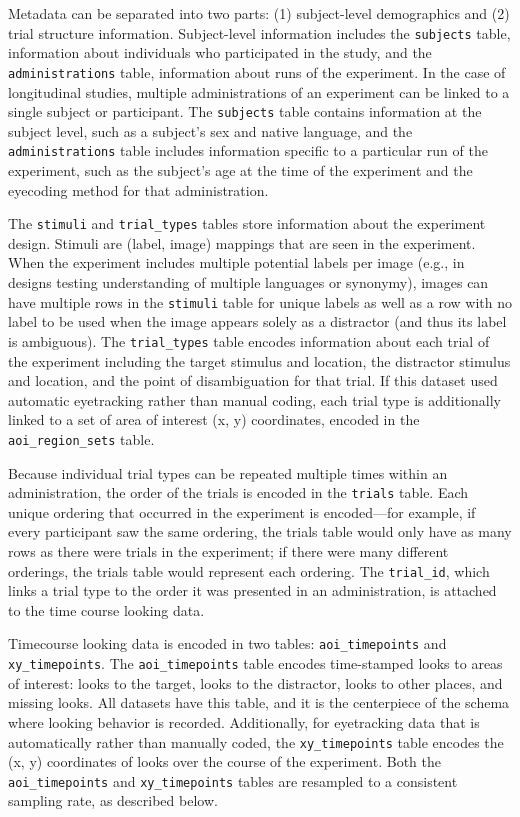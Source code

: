 \documentclass[
  english,
  man,floatsintext]{apa6}
\begin{document}
Metadata can be separated into two parts: (1) subject-level demographics and (2) trial structure information. Subject-level information includes the \texttt{subjects} table, information about individuals who participated in the study, and the \texttt{administrations} table, information about runs of the experiment. In the case of longitudinal studies, multiple administrations of an experiment can be linked to a single subject or participant. The \texttt{subjects} table contains information at the subject level, such as a subject's sex and native language, and the \texttt{administrations} table includes information specific to a particular run of the experiment, such as the subject's age at the time of the experiment and the eyecoding method for that administration.

The \texttt{stimuli} and \texttt{trial\_types} tables store information about the experiment design. Stimuli are (label, image) mappings that are seen in the experiment. When the experiment includes multiple potential labels per image (e.g., in designs testing understanding of multiple languages or synonymy), images can have multiple rows in the \texttt{stimuli} table for unique labels as well as a row with no label to be used when the image appears solely as a distractor (and thus its label is ambiguous). The \texttt{trial\_types} table encodes information about each trial of the experiment including the target stimulus and location, the distractor stimulus and location, and the point of disambiguation for that trial. If this dataset used automatic eyetracking rather than manual coding, each trial type is additionally linked to a set of area of interest (x, y) coordinates, encoded in the \texttt{aoi\_region\_sets} table.

Because individual trial types can be repeated multiple times within an administration, the order of the trials is encoded in the \texttt{trials} table. Each unique ordering that occurred in the experiment is encoded---for example, if every participant saw the same ordering, the trials table would only have as many rows as there were trials in the experiment; if there were many different orderings, the trials table would represent each ordering. The \texttt{trial\_id}, which links a trial type to the order it was presented in an administration, is attached to the time course looking data.

Timecourse looking data is encoded in two tables: \texttt{aoi\_timepoints} and \texttt{xy\_timepoints}. The \texttt{aoi\_timepoints} table encodes time-stamped looks to areas of interest: looks to the target, looks to the distractor, looks to other places, and missing looks. All datasets have this table, and it is the centerpiece of the schema where looking behavior is recorded. Additionally, for eyetracking data that is automatically rather than manually coded, the \texttt{xy\_timepoints} table encodes the (x, y) coordinates of looks over the course of the experiment. Both the \texttt{aoi\_timepoints} and \texttt{xy\_timepoints} tables are resampled to a consistent sampling rate, as described below.
\end{document}

